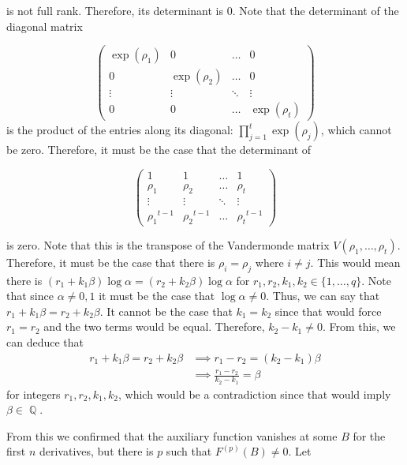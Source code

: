 \documentclass[a4paper, 11pt]{book}
\DeclareMathOperator{\Q}{\mathbb{Q}}
\begin{document}
is not full rank. Therefore, its determinant is $0$. Note that the determinant of the diagonal matrix

\[\begin{pmatrix}
        \exp(\rho_1) & 0 & \hdots & 0 \\
        0 & \exp(\rho_2) & \hdots & 0 \\
        \vdots & \vdots & \ddots & \vdots \\
        0 & 0 & \hdots & \exp(\rho_t) 
    \end{pmatrix}\]
is the product of the entries along its diagonal: $\prod\limits_{j=1}^{t}\exp(\rho_{j})$, which cannot be zero. Therefore, it must be the case that the determinant of 

\[\begin{pmatrix}
        1 & 1 & \hdots & 1 \\
        \rho_{1} & \rho_{2} & \hdots & {\rho_t} \\ 
        \vdots & \vdots & \ddots & \vdots \\
        {\rho_{1}}^{t-1} & {\rho_{2}}^{t-1} & \hdots & {\rho_t}^{t-1}
    \end{pmatrix}\] 

    is zero. Note that this is the transpose of the Vandermonde matrix $V(\rho_1, \ldots, \rho_t)$. Therefore, it must be the case that there is $\rho_i = \rho_j$ where $i \neq j$. This would mean there is $\left(r_1 + k_1 \beta \right)\log \alpha = \left(r_2 + k_2 \beta\right) \log \alpha$ for $r_1, r_2, k_1, k_2 \in \{1, \ldots, q\}$. Note that since $\alpha \neq 0, 1$ it must be the case that $\log \alpha \neq 0$. Thus, we can say that $r_1 + k_1 \beta = r_2 + k_2 \beta$. It cannot be the case that $k_1 = k_2$ since that would force $r_1 = r_2$ and the two terms would be equal. Therefore, $k_2 - k_1 \neq 0$. From this, we can deduce that  
    \begin{align*}
        r_1 + k_1 \beta = r_2 + k_2 \beta &\implies r_1 - r_2 = (k_2 - k_1) \beta \\
                                          &\implies \frac{r_1 - r_2}{k_2 - k_1} = \beta
    \end{align*}
for integers $r_1, r_2, k_1, k_2$, which would be a contradiction since that would imply $\beta \in \Q$.\par

From this we confirmed that the auxiliary function vanishes at some $B$ for the first $n$ derivatives, but there is $p$ such that $F^{(p)}(B) \neq 0$. Let 
\end{document}

